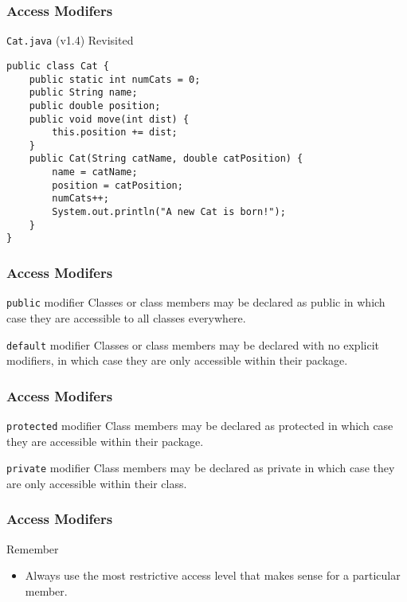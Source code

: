 \documentclass[10pt, compress]{beamer}
\begin{document}
\begin{frame}[fragile]
	\frametitle{Access Modifers}
	\begin{block}{\texttt{Cat.java} (v1.4) Revisited}
		\begin{verbatim}
public class Cat {
	public static int numCats = 0;
	public String name;
	public double position;
	public void move(int dist) {
		this.position += dist;
	}
	public Cat(String catName, double catPosition) {
		name = catName;
		position = catPosition;
		numCats++;
		System.out.println("A new Cat is born!");
	}
}
		\end{verbatim}
	\end{block}
\end{frame}

\begin{frame}[fragile]
	\frametitle{Access Modifers}
	\begin{block}{\texttt{public} modifier}
		Classes or class members may be declared as \alert{public} in which case they are accessible to all classes everywhere.
	\end{block}
	\begin{block}{\texttt{default} modifier}
		Classes or class members may be declared with no explicit modifiers, in which case they are only accessible within their package.
	\end{block}
\end{frame}

\begin{frame}[fragile]
	\frametitle{Access Modifers}
	\begin{block}{\texttt{protected} modifier}
		Class members may be declared as \alert{protected} in which case they are accessible within their package.
	\end{block}
	\begin{block}{\texttt{private} modifier}
		Class members may be declared as \alert{private} in which case they are only accessible within their class.
	\end{block}
\end{frame}

\begin{frame}[fragile]
	\frametitle{Access Modifers}
	\begin{block}{Remember}
		\begin{itemize}
		\item[] Always use the most restrictive access level that makes sense for a particular member.
		\end{itemize}
	\end{block}
\end{frame}
\end{document}
